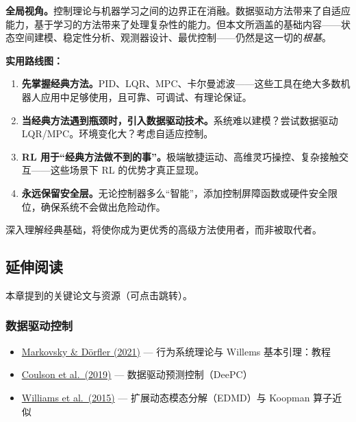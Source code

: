 \begin{mdframed}
\textbf{全局视角。}\;控制理论与机器学习之间的边界正在消融。数据驱动方法带来了自适应能力，基于学习的方法带来了处理复杂性的能力。但本文所涵盖的基础内容------状态空间建模、稳定性分析、观测器设计、最优控制------仍然是这一切的\emph{根基}。

\textbf{实用路线图：}
\begin{enumerate}[nosep]
    \item \textbf{先掌握经典方法。}PID、LQR、MPC、卡尔曼滤波------这些工具在绝大多数机器人应用中足够使用，且可靠、可调试、有理论保证。
    \item \textbf{当经典方法遇到瓶颈时，引入数据驱动技术。}系统难以建模？尝试数据驱动 LQR/MPC。环境变化大？考虑自适应控制。
    \item \textbf{RL 用于``经典方法做不到的事''。}极端敏捷运动、高维灵巧操控、复杂接触交互------这些场景下 RL 的优势才真正显现。
    \item \textbf{永远保留安全层。}无论控制器多么``智能''，添加控制屏障函数或硬件安全限位，确保系统不会做出危险动作。
\end{enumerate}

深入理解经典基础，将使你成为更优秀的高级方法使用者，而非被取代者。
\end{mdframed}

\subsection{延伸阅读}

本章提到的关键论文与资源（可点击跳转）。

\subsubsection*{数据驱动控制}
\begin{itemize}[nosep]
    \item \href{https://arxiv.org/abs/2206.00397}{Markovsky \& Dörfler (2021)} --- 行为系统理论与 Willems 基本引理：教程
    \item \href{https://arxiv.org/abs/1811.05890}{Coulson et al.\ (2019)} --- 数据驱动预测控制（DeePC）
    \item \href{https://arxiv.org/abs/1408.4408}{Williams et al.\ (2015)} --- 扩展动态模态分解（EDMD）与 Koopman 算子近似
\end{itemize}

